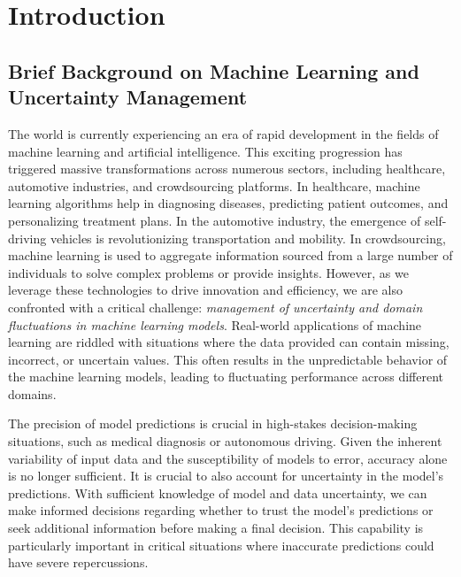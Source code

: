 \chapter{Introduction}

\section{Brief Background on Machine Learning and Uncertainty Management}
The world is currently experiencing an era of rapid development in the fields of machine learning and artificial intelligence. This exciting progression has triggered massive transformations across numerous sectors, including healthcare, automotive industries, and crowdsourcing platforms. In healthcare, machine learning algorithms help in diagnosing diseases, predicting patient outcomes, and personalizing treatment plans. In the automotive industry, the emergence of self-driving vehicles is revolutionizing transportation and mobility. In crowdsourcing, machine learning is used to aggregate information sourced from a large number of individuals to solve complex problems or provide insights. However, as we leverage these technologies to drive innovation and efficiency, we are also confronted with a critical challenge: \textit{management of uncertainty and domain fluctuations in machine learning models}. Real-world applications of machine learning are riddled with situations where the data provided can contain missing, incorrect, or uncertain values. This often results in the unpredictable behavior of the machine learning models, leading to fluctuating performance across different domains.

The precision of model predictions is crucial in high-stakes decision-making situations, such as medical diagnosis or autonomous driving. Given the inherent variability of input data and the susceptibility of models to error, accuracy alone is no longer sufficient. It is crucial to also account for uncertainty in the model's predictions. With sufficient knowledge of model and data uncertainty, we can make informed decisions regarding whether to trust the model's predictions or seek additional information before making a final decision. This capability is particularly important in critical situations where inaccurate predictions could have severe repercussions.

